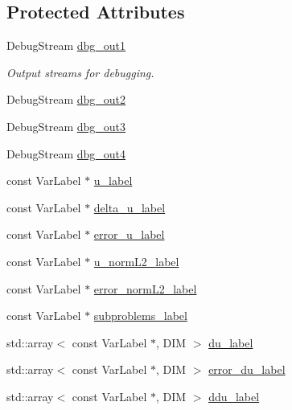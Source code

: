 \subsection*{Protected Attributes}
\begin{DoxyCompactItemize}
\item 
Debug\+Stream \hyperlink{classUintah_1_1PhaseField_1_1Heat_a0e7faf909e7e82c7c0aff03d261a6fa9}{dbg\+\_\+out1}
\begin{DoxyCompactList}\small\item\em Output streams for debugging. \end{DoxyCompactList}\item 
Debug\+Stream \hyperlink{classUintah_1_1PhaseField_1_1Heat_af10b94a5699065313918cf8291b355f8}{dbg\+\_\+out2}
\item 
Debug\+Stream \hyperlink{classUintah_1_1PhaseField_1_1Heat_a8e385e1c1be12146007488186869059c}{dbg\+\_\+out3}
\item 
Debug\+Stream \hyperlink{classUintah_1_1PhaseField_1_1Heat_a541791b40ca8a1dec4964f5e44462da7}{dbg\+\_\+out4}
\item 
const Var\+Label $\ast$ \hyperlink{classUintah_1_1PhaseField_1_1Heat_a8318c248305ac851f69f313697ee3b04}{u\+\_\+label}
\item 
const Var\+Label $\ast$ \hyperlink{classUintah_1_1PhaseField_1_1Heat_a7b051c5513975a78a9049ff5bfd3308f}{delta\+\_\+u\+\_\+label}
\item 
const Var\+Label $\ast$ \hyperlink{classUintah_1_1PhaseField_1_1Heat_ab206aed0bd72c3395ff1d41c3764ddaa}{error\+\_\+u\+\_\+label}
\item 
const Var\+Label $\ast$ \hyperlink{classUintah_1_1PhaseField_1_1Heat_a03406a63938c13923f72306097a3aef2}{u\+\_\+norm\+L2\+\_\+label}
\item 
const Var\+Label $\ast$ \hyperlink{classUintah_1_1PhaseField_1_1Heat_a664b5e6adac2b2d4a5a56596d81ee9c2}{error\+\_\+norm\+L2\+\_\+label}
\item 
const Var\+Label $\ast$ \hyperlink{classUintah_1_1PhaseField_1_1Heat_a1305118ea9f1abeff12771589bca3ef9}{subproblems\+\_\+label}
\item 
std\+::array$<$ const Var\+Label $\ast$, D\+IM $>$ \hyperlink{classUintah_1_1PhaseField_1_1Heat_af869883fdc795a1cc272c01c15a6713e}{du\+\_\+label}
\item 
std\+::array$<$ const Var\+Label $\ast$, D\+IM $>$ \hyperlink{classUintah_1_1PhaseField_1_1Heat_a2998333c458933bc675526b073b7510d}{error\+\_\+du\+\_\+label}
\item 
std\+::array$<$ const Var\+Label $\ast$, D\+IM $>$ \hyperlink{classUintah_1_1PhaseField_1_1Heat_a561356648be34dbc45f66ce6ae8f3d3c}{ddu\+\_\+label}

\end{DoxyCompactItemize}
